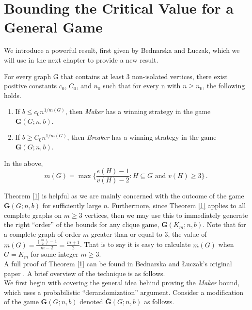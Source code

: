 \documentclass[a4paper,oneside,11pt]{report}
\begin{document}
\chapter{Bounding the Critical Value for a General Game} 

We introduce a powerful result, first given by Bednarska and \L{}uczak, which we will use in the next chapter to provide a new result.

\begin{theorem}\label{1}

For every graph G that contains at least 3 non-isolated vertices, there exist positive constants $c_0$, $C_0$, and $n_0$ such that for every n with $n \geqslant n_0$, the following holds.

\begin{enumerate}
    
    \item If $b \leqslant c_0n^{1/m(G)}$, then \textit{Maker} has a winning strategy in the game $\textbf{G}(G;n,b)$.
    
    \item If $b \geqslant C_0n^{1/m(G)}$, then \textit{Breaker} has a winning strategy in the game $\textbf{G}(G;n,b)$.

\end{enumerate}

In the above, \[m(G)=\max\Big\{\frac{e(H)-1}{v(H)-2}:H\subseteq{G} \text{ and } v(H) \geqslant 3\Big\}\,.\]

\end{theorem}

Theorem \ref{1} is helpful as we are mainly concerned with the outcome of the game $\textbf{G}(G;n,b)$ for sufficiently large $n$. Furthermore, since Theorem \ref{1} applies to all complete graphs on $m \geqslant 3$ vertices, then we may use this to immediately generate the right ``order'' of the bounds for any clique game,  $\textbf{G}(K_m;n,b)$. Note that for a complete graph of order $m$ greater than or equal to $3$, the value of $m(G) = \frac{\binom{m}{2}-1}{m-2} = \frac{m+1}{2}$. That is to say it is easy to calculate $m(G)$ when $G = K_m$ for some integer $m \geqslant 3$.\\

A full proof of Theorem \ref{1} can be found in Bednarska and \L{}uczak's original paper \cite{bednarska2000biased}. A brief overview of the technique is as follows.\\

We first begin with covering the general idea behind proving the \textit{Maker} bound, which uses a probabilistic ``derandomization'' argument. Consider a modification of the game $\textbf{G}(G;n,b)$ denoted  $\overline{\textbf{G}}(G;n,b)$ as follows.
\end{document}
